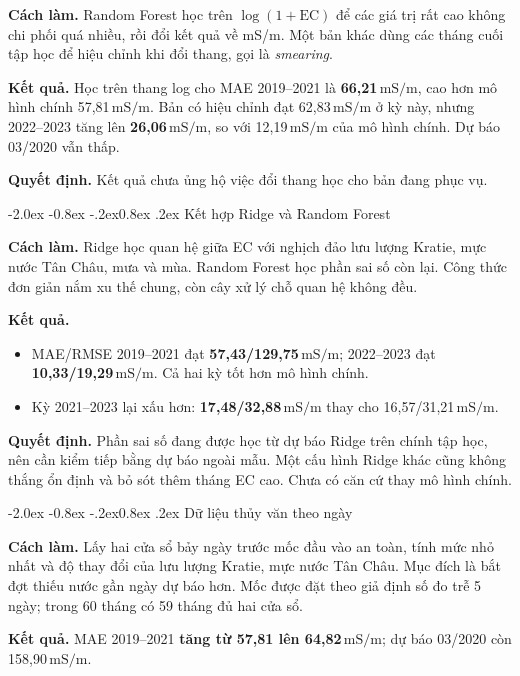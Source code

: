 \documentclass[12pt,a4paper,oneside]{report}
\makeatletter
\newcommand{\ms}{\ensuremath{\,\mathrm{mS/m}}}
\renewcommand\section{\@startsection{section}{1}{\z@}%
  {-2.0ex \@plus -0.8ex \@minus -.2ex}{0.8ex \@plus .2ex}%
  {\normalfont\large\bfseries\color{mainteal}}}
\makeatother
\begin{document}
\textbf{Cách làm.} Random Forest học trên $\log(1+\mathrm{EC})$ để các giá trị rất cao không chi phối quá nhiều, rồi đổi kết quả về mS/m. Một bản khác dùng các tháng cuối tập học để hiệu chỉnh khi đổi thang, gọi là \emph{smearing}.

\textbf{Kết quả.} Học trên thang log cho MAE 2019--2021 là \textbf{66,21\ms}, cao hơn mô hình chính 57,81\ms. Bản có hiệu chỉnh đạt 62,83\ms{} ở kỳ này, nhưng 2022--2023 tăng lên \textbf{26,06\ms}, so với 12,19\ms{} của mô hình chính. Dự báo 03/2020 vẫn thấp.

\textbf{Quyết định.} Kết quả chưa ủng hộ việc đổi thang học cho bản đang phục vụ.

\section{Kết hợp Ridge và Random Forest}

\textbf{Cách làm.} Ridge học quan hệ giữa EC với nghịch đảo lưu lượng Kratie, mực nước Tân Châu, mưa và mùa. Random Forest học phần sai số còn lại. Công thức đơn giản nắm xu thế chung, còn cây xử lý chỗ quan hệ không đều.

\textbf{Kết quả.}
\begin{itemize}
  \item MAE/RMSE 2019--2021 đạt \textbf{57,43/129,75\ms}; 2022--2023 đạt \textbf{10,33/19,29\ms}. Cả hai kỳ tốt hơn mô hình chính.
  \item Kỳ 2021--2023 lại xấu hơn: \textbf{17,48/32,88\ms} thay cho 16,57/31,21\ms.
\end{itemize}
\textbf{Quyết định.} Phần sai số đang được học từ dự báo Ridge trên chính tập học, nên cần kiểm tiếp bằng dự báo ngoài mẫu. Một cấu hình Ridge khác cũng không thắng ổn định và bỏ sót thêm tháng EC cao. Chưa có căn cứ thay mô hình chính.

\section{Dữ liệu thủy văn theo ngày}

\textbf{Cách làm.} Lấy hai cửa sổ bảy ngày trước mốc đầu vào an toàn, tính mức nhỏ nhất và độ thay đổi của lưu lượng Kratie, mực nước Tân Châu. Mục đích là bắt đợt thiếu nước gần ngày dự báo hơn. Mốc được đặt theo giả định số đo trễ 5 ngày; trong 60 tháng có 59 tháng đủ hai cửa sổ.

\textbf{Kết quả.} MAE 2019--2021 \textbf{tăng từ 57,81 lên 64,82\ms}; dự báo 03/2020 còn 158,90\ms.
\end{document}
